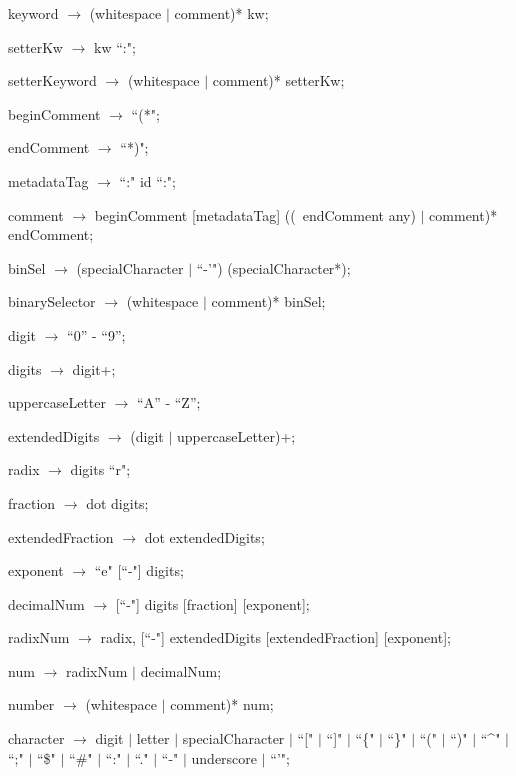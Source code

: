 \documentclass{article}
\begin{document}
\begin{newspeak}
keyword $\rightarrow$ (whitespace $|$ comment)*  kw; 

setterKw $\rightarrow$ kw  ``:"; 

setterKeyword $\rightarrow$ (whitespace $|$ comment)*  setterKw;  

beginComment $\rightarrow$   ``(*";

endComment $\rightarrow$  ``*)";
 
metadataTag $\rightarrow$  ``:" id  ``:";
 
comment $\rightarrow$ beginComment  [metadataTag] ((~endComment any) $|$ comment)*	endComment;
 
binSel $\rightarrow$  (specialCharacter $|$  ``-'") (specialCharacter*);
                                           
binarySelector $\rightarrow$ (whitespace $|$ comment)*  binSel;
                                           
digit $\rightarrow$ ``0'' - ``9'';

digits $\rightarrow$  digit+;

uppercaseLetter $\rightarrow$ ``A'' - ``Z'';

extendedDigits $\rightarrow$ (digit $|$ uppercaseLetter)+;

radix $\rightarrow$ digits ``r";
                   
fraction $\rightarrow$  dot digits;

extendedFraction $\rightarrow$  dot extendedDigits;
                        
exponent $\rightarrow$  ``e"  [``-"] digits;

decimalNum $\rightarrow$ [``-"] digits [fraction] [exponent];

radixNum $\rightarrow$ radix,
                [``-"] 
               extendedDigits 
               [extendedFraction]
               [exponent];
                                                                                                                   
num $\rightarrow$   radixNum $|$ decimalNum;
                                                                                                         
number $\rightarrow$  (whitespace $|$ comment)*  num;
                                                                                                         
character $\rightarrow$ digit $|$ letter $|$ specialCharacter $|$  ``[" $|$  ``]"  $|$
                 ``\{" $|$  ``\}" $|$  ``("  $|$  ``)" $|$ 
                 ``\^{}" $|$  ``;" $|$  ``\$" $|$  ``\#" $|$
                 ``:" $|$  ``." $|$  ``-" $|$ underscore $|$  ``\textquoteright"; 
                 

\end{newspeak}
\end{document}
